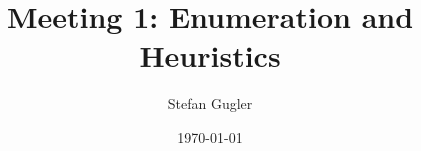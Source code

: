 \documentclass{beamer}
\title[Meeting 1]{Meeting 1: Enumeration and Heuristics} %
\author{Stefan Gugler} %
\institute[MIT] %
{
	Massachusetts Institute of Technology \\ %
	\medskip
	\textit{sgugler@mit.edu} %
}
\date{\today} %
\begin{document}
	
	\begin{frame}
	\titlepage %
\end{frame}




\end{document}
